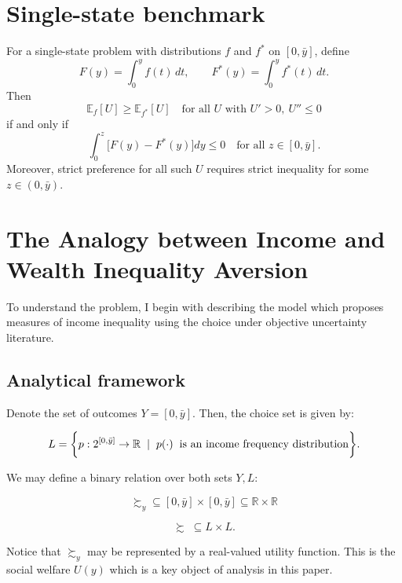 \documentclass[Chp3.tex]{subfiles}
\begin{document}
\section{Single-state benchmark}

\begin{prop}
For a single-state problem with distributions $f$ and $f^*$ on $[0,\bar y]$, define
\[
F(y)=\int_0^y f(t)\,dt,
\qquad
F^*(y)=\int_0^y f^*(t)\,dt.
\]
Then
\[
\mathbb{E}_{f}[U] \ge \mathbb{E}_{f^*}[U]
\quad\text{for all } U\text{ with }U'>0,\ U''\le 0
\]
if and only if
\[
\int_0^z \big[F(y)-F^*(y)\big]dy \le 0
\quad\text{for all } z\in[0,\bar y].
\]
Moreover, strict preference for all such $U$ requires strict inequality for some $z\in(0,\bar y)$.
\end{prop}

\section{The Analogy between Income and Wealth Inequality Aversion}
\label{app:objective-benchmark}

\par To understand the problem, I begin with describing the model which proposes measures of income inequality using the choice under objective uncertainty literature. 

\subsection*{Analytical framework}

\par Denote the set of outcomes $Y = [0,\bar{y}]$. Then, the choice set is given by:

$$ L = \bigg\{ p: 2^{[0,\bar{y}]} \to \mathbb{R} \hspace{2mm} | \hspace{2mm} p(\cdot) \hspace{2mm} \text{is an income frequency distribution}  \bigg\}. $$

\par We may define a binary relation over both sets $Y,L:$

$$ \succsim_{y} \subseteq [0,\bar{y}] \times [0,\bar{y}] \subseteq \mathbb{R} \times \mathbb{R} $$

$$ \succsim \; \subseteq L \times L. $$

\par Notice that $\succsim_y$ may be represented by a real-valued utility function. This is the social welfare $U(y)$ which is a key object of analysis in this paper. 
\end{document}
